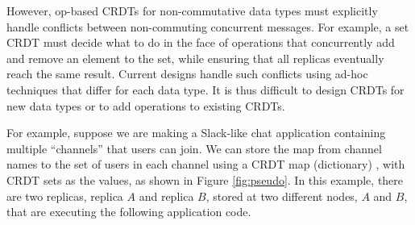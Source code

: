 \documentclass[acmsmall,nonacm,12pt]{acmart}
\theoremstyle{plain}
\theoremstyle{definition}
\begin{document}
However, op-based CRDTs for non-commutative data types must explicitly handle conflicts between non-commuting concurrent messages.  For example, a set CRDT must decide what to do in the face of operations that concurrently add and remove an element to the set, while ensuring that all replicas eventually reach the same result.  Current designs handle such conflicts using ad-hoc techniques that differ for each data type.  It is thus difficult to design CRDTs for new data types or to add operations to existing CRDTs.

For example, suppose we are making a Slack-like chat application containing multiple ``channels'' that users can join.  We can store the map from channel names to the set of users in each channel using a CRDT map (dictionary) \cite{antidote, riak_datatypes}, with CRDT sets as the values, as shown in Figure \ref{fig:pseudo}.  In this example, there are two replicas, replica $A$ and replica $B$, stored at two different nodes, $A$ and $B$, that are executing the following application code.
\end{document}
